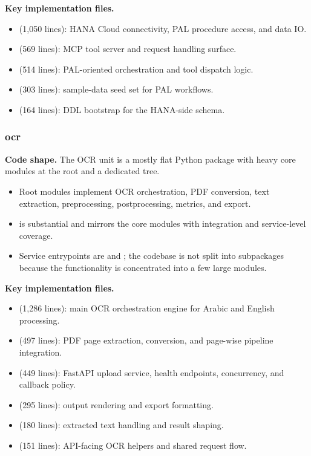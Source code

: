 \documentclass[11pt,a4paper]{article}
\begin{document}
\textbf{Key implementation files.}
\begin{itemize}[leftmargin=*]
    \item {} (1,050 lines): HANA Cloud connectivity, PAL procedure access, and data IO.
    \item {} (569 lines): MCP tool server and request handling surface.
    \item {} (514 lines): PAL-oriented orchestration and tool dispatch logic.
    \item {} (303 lines): sample-data seed set for PAL workflows.
    \item {} (164 lines): DDL bootstrap for the HANA-side schema.
\end{itemize}

\subsubsection{ocr}

\textbf{Code shape.} The OCR unit is a mostly flat Python package with heavy core modules at the root and a dedicated  tree.
\begin{itemize}[leftmargin=*]
    \item Root modules implement OCR orchestration, PDF conversion, text extraction, preprocessing, postprocessing, metrics, and export.
    \item {} is substantial and mirrors the core modules with integration and service-level coverage.
    \item Service entrypoints are  and ; the codebase is not split into subpackages because the functionality is concentrated into a few large modules.
\end{itemize}

\textbf{Key implementation files.}
\begin{itemize}[leftmargin=*]
    \item {} (1,286 lines): main OCR orchestration engine for Arabic and English processing.
    \item {} (497 lines): PDF page extraction, conversion, and page-wise pipeline integration.
    \item {} (449 lines): FastAPI upload service, health endpoints, concurrency, and callback policy.
    \item {} (295 lines): output rendering and export formatting.
    \item {} (180 lines): extracted text handling and result shaping.
    \item {} (151 lines): API-facing OCR helpers and shared request flow.
\end{itemize}
\end{document}
